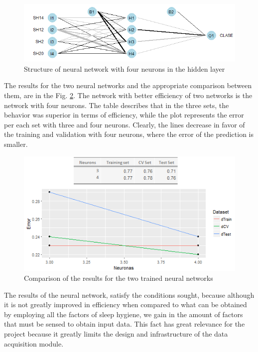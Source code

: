 \documentclass[]{book}
\begin{document}
\begin{figure}[H]

{\centering \includegraphics[width=0.8\linewidth]{images/nn-four-neurons} 

}

\caption{Structure of neural network with four neurons in the hidden layer}\label{fig:nn-four-neurons}
\end{figure}

The results for the two neural networks and the appropriate comparison
between them, are in the Fig. \ref{fig:results-of-the-3-4-nn}. The
network with better efficiency of two networks is the network with four
neurons. The table describes that in the three sets, the behavior was
superior in terms of efficiency, while the plot represents the error per
each set with three and four neurons. Clearly, the lines decrease in
favor of the training and validation with four neurons, where the error
of the prediction is smaller.

\begin{figure}[H]

{\centering \includegraphics[width=0.8\linewidth]{images/results-of-the-3-4-nn} 

}

\caption{Comparison of the results for the two trained neural networks}\label{fig:results-of-the-3-4-nn}
\end{figure}

The results of the neural network, satisfy the conditions sought,
because although it is not greatly improved in efficiency when compared
to what can be obtained by employing all the factors of sleep hygiene,
we gain in the amount of factors that must be sensed to obtain input
data. This fact has great relevance for the project because it greatly
limits the design and infrastructure of the data acquisition module.
\end{document}
